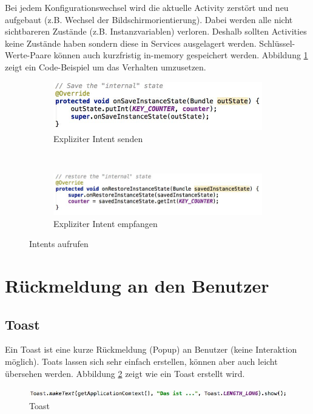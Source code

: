 Bei jedem Konfigurationswechsel wird die aktuelle Activity zerstört und neu aufgebaut (z.B. Wechsel der Bildschirmorientierung). Dabei werden alle nicht sichtbareren Zustände (z.B. Instanzvariablen) verloren. Deshalb sollten Activities keine Zustände haben sondern diese in Services ausgelagert werden. Schlüssel-Werte-Paare können auch kurzfristig in-memory gespeichert werden. Abbildung \ref{fig:instance-state} zeigt ein Code-Beispiel um das Verhalten umzusetzen.
\begin{figure}
	\centering
	\begin{subfigure}[b]{0.4\textwidth}
		\includegraphics[width=\textwidth]{fig/save-instance}
		\caption{Expliziter Intent senden}
	\end{subfigure}
	~
	\begin{subfigure}[b]{0.4\textwidth}
		\includegraphics[width=\textwidth]{fig/restore-instance}
		\caption{Expliziter Intent empfangen}
	\end{subfigure}
	\caption{Intents aufrufen}
	\label{fig:instance-state}
\end{figure}

\section{Rückmeldung an den Benutzer}

\subsection{Toast}

Ein Toast ist eine kurze Rückmeldung (Popup) an Benutzer (keine Interaktion möglich). Toats lassen sich sehr einfach erstellen, können aber auch leicht übersehen werden. Abbildung \ref{fig:toast} zeigt wie ein Toast erstellt wird.
\begin{figure}
\centering
\includegraphics[width=\linewidth]{fig/toast}
\caption{Toast}
\label{fig:toast}
\end{figure}

